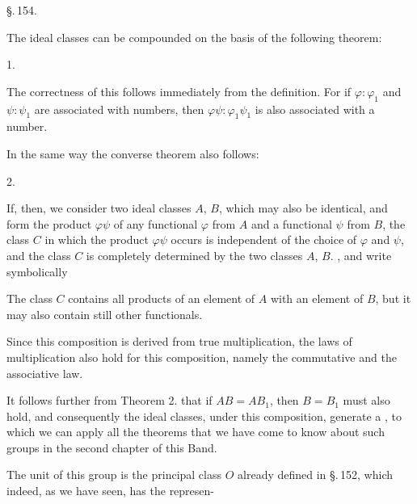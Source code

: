 
\S.\,154.

\begin{center}
\end{center}

The ideal classes can be compounded on the basis of the following theorem:

1.~

The correctness of this follows immediately from the definition. For if $\varphi:\varphi_1$ and $\psi:\psi_1$ are associated with numbers, then $\varphi\psi:\varphi_1\psi_1$ is also associated with a number.

In the same way the converse theorem also follows:

2.~

If, then, we consider two ideal classes $A$, $B$, which may also be identical, and form the product $\varphi\psi$ of any functional $\varphi$ from $A$ and a functional $\psi$ from $B$, the class $C$ in which the product $\varphi\psi$ occurs is independent of the choice of $\varphi$ and $\psi$, and the class $C$ is completely determined by the two classes $A$, $B$. , and write symbolically


The class $C$ contains all products of an element of $A$ with an element of $B$, but it may also contain still other functionals.

Since this composition is derived from true multiplication, the laws of multiplication also hold for this composition, namely the commutative and the associative law.

It follows further from Theorem 2. that if $AB = AB_1$, then $B = B_1$ must also hold, and consequently the ideal classes, under this composition, generate a , to which we can apply all the theorems that we have come to know about such groups in the second chapter of this Band.

The unit of this group is the principal class $O$ already defined in \S.\,152, which indeed, as we have seen, has the represen-
